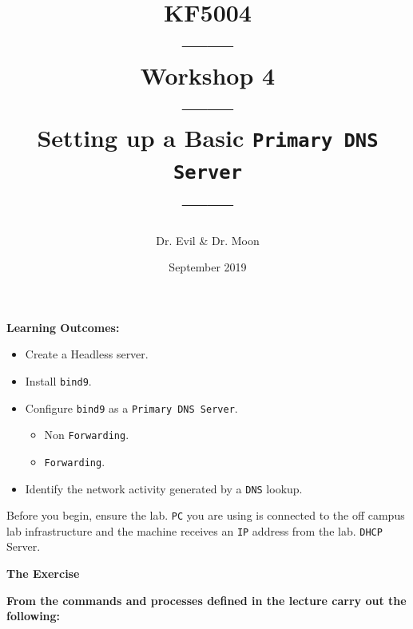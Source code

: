 \documentclass[11pt]{article}
\begin{document}
\author{Dr. Evil \& Dr. Moon}
\title{KF5004\\------\\Workshop 4\\------\\Setting up a Basic \texttt{Primary DNS Server}\\------}
\date{September 2019}
\maketitle

\newpage



\noindent\textbf{Learning Outcomes:}
\begin{itemize}
    \item Create a Headless server.
    \item Install \texttt{bind9}.
    \item Configure \texttt{bind9} as a \texttt{Primary DNS Server}.
        \begin{itemize} 
            \item Non \texttt{Forwarding}.
            \item \texttt{Forwarding}.
        \end{itemize} 
    \item Identify the network activity generated by a \texttt{DNS} lookup.
\end{itemize}


\begin{tcolorbox}[title={\textbf{Important:}}]
    Before you begin, ensure the lab. \texttt{PC} you are using is connected to the off campus lab infrastructure and the machine receives an \texttt{IP} address from the lab. \texttt{DHCP} Server.
\end{tcolorbox}
\newpage

\noindent\textbf{The Exercise}\\
\begin{tcolorbox}[colback=blue!20]
    \noindent\textbf{From the commands and processes defined in the lecture carry out the following:}
\end{tcolorbox}
\end{document}
